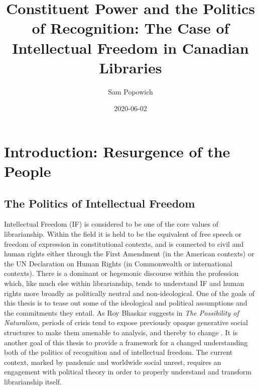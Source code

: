 \documentclass[12pt,oneside]{memoir}
\title{Constituent Power and the Politics of Recognition: The Case of Intellectual Freedom in Canadian Libraries}
\author{Sam Popowich}
\date{2020-06-02}
\begin{document}
\maketitle
\clearpage


\tableofcontents


\newpage
\setcounter{page}{1}

\mainmatter

\chapter{Introduction: Resurgence of the People}
\label{scrivauto:5}

\section{The Politics of Intellectual Freedom}
\label{scrivauto:6}

Intellectual Freedom (IF) is considered to be one of the core values of librarianship. Within the field it is held to be the equivalent of free speech or freedom of expression in constitutional contexts, and is connected to civil and human rights either through the First Amendment (in the American contexts) or the UN Declaration on Human Rights (in Commonwealth or international contexts). There is a dominant or hegemonic discourse within the profession which, like much else within librarianship, tends to understand IF and human rights more broadly as politically neutral and non-ideological. One of the goals of this thesis is to tease out some of the ideological and political assumptions and the commitments they entail. As Roy Bhaskar suggests in \textit{The Possibility of Naturalism}, periods of crisis tend to expose previously opaque generative social structures to make them amenable to analysis, and thereby to change \cite[52]{bhaskar-1979}. It is another goal of this thesis to provide a framework for a changed understanding both of the politics of recognition and of intellectual freedom. The current context, marked by pandemic and worldwide social unrest, requires an engagement with political theory in order to properly understand and transform librarianship itself.
\end{document}
